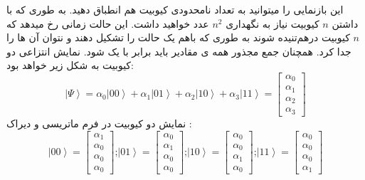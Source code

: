 این بازنمایی را میتوانید به تعداد نامحدودی کیوبیت هم انطباق دهید. به طوری که با داشتن $n$ کیوبیت نیاز به نگهداری $n^{2}$ عدد خواهید داشت. این حالت زمانی رخ میدهد که $n$ کیوبیت درهم‌تنیده
 شوند به طوری که باهم یک حالت را تشکیل دهند و نتوان آن ها را جدا کرد. 
\cite{fundamentalsandapplications}
همچنان جمع مجذور همه ی مقادیر باید برابر با یک شود. نمایش انتزاعی دو کیوبیت به شکل زیر خواهد بود:
\begin{equation}
\left|\Psi\right\rangle = \alpha_{0}\left|00\right\rangle +  \alpha_{1}\left|01\right\rangle +  \alpha_{2}\left|10\right\rangle +  \alpha_{3}\left|11\right\rangle = \begin{bmatrix}
 \alpha_{0}
\\
 \alpha_{1}
\\
 \alpha_{2}
\\
 \alpha_{3}
\end{bmatrix}
\end{equation}
نمایش دو کیوبیت در فرم ماتریسی و دیراک
:
\begin{equation}
\left|00\right\rangle  = \begin{bmatrix}
 \alpha_{1}
\\
 \alpha_{0}
\\
 \alpha_{0}
\\
 \alpha_{0}
\end{bmatrix}
\text{;}
\left|01\right\rangle  = \begin{bmatrix}
 \alpha_{0}
\\
 \alpha_{1}
\\
 \alpha_{0}
\\
 \alpha_{0}
\end{bmatrix}
\text{;}
\left|10\right\rangle  = \begin{bmatrix}
 \alpha_{0}
\\
 \alpha_{0}
\\
 \alpha_{1}
\\
 \alpha_{0}
\end{bmatrix}
\text{;}
\left|11\right\rangle  = \begin{bmatrix}
 \alpha_{0}
\\
 \alpha_{0}
\\
 \alpha_{0}
\\
 \alpha_{1}
\end{bmatrix}
\end{equation}


